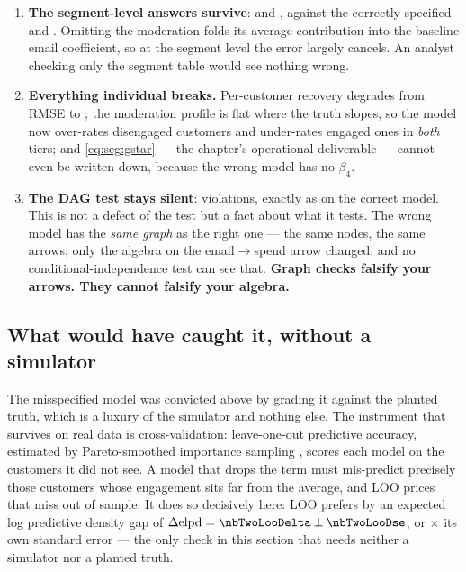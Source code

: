 \begin{enumerate}[leftmargin=*, itemsep=.35em]
  \item \textbf{The segment-level answers survive}: \eur{\nbTwoBadLow} and \eur{\nbTwoBadHigh},
        against the correctly-specified \eur{\nbTwoCateLow} and \eur{\nbTwoCateHigh}. Omitting the
        moderation folds its average contribution into the baseline email coefficient, so at the
        segment level the error largely cancels. An analyst checking only the segment table would
        see nothing wrong.
  \item \textbf{Everything individual breaks.} Per-customer recovery degrades from RMSE
        \eur{\nbTwoRmseInd} to \eur{\nbTwoRmseBad}; the moderation profile is flat where the truth
        slopes, so the model now over-rates disengaged customers and under-rates engaged ones in
        \emph{both} tiers; and \cref{eq:seg:gstar} --- the chapter's operational deliverable ---
        cannot even be written down, because the wrong model has no $\beta_4$.
  \item \textbf{The DAG test stays silent}: \nbTwoDagBadViolations{} violations, exactly as on the
        correct model. This is not a defect of the test but a fact about what it tests. The wrong
        model has the \emph{same graph} as the right one --- the same nodes, the same arrows; only
        the algebra on the email$\rightarrow$spend arrow changed, and no conditional-independence
        test can see that. \textbf{Graph checks falsify your arrows. They cannot falsify your
        algebra.}
\end{enumerate}

\subsection*{What would have caught it, without a simulator}

The misspecified model was convicted above by grading it against the planted truth, which is a
luxury of the simulator and nothing else. The instrument that survives on real data is
cross-validation: leave-one-out predictive accuracy, estimated by Pareto-smoothed importance
sampling \citep[PSIS-LOO;][]{vehtari2017}, scores each model on the customers it did not see. A model that drops the
 term must mis-predict precisely those customers whose engagement sits far
from the average, and LOO prices that miss out of sample. It does so decisively here: LOO prefers
\nbTwoLooWinner{} by an expected log predictive density gap of $\Delta\mathrm{elpd} =
\nbTwoLooDelta \pm \nbTwoLooDse$, or \nbTwoLooRatio$\times$ its own standard error --- the only check
in this section that needs neither a simulator nor a planted truth.

